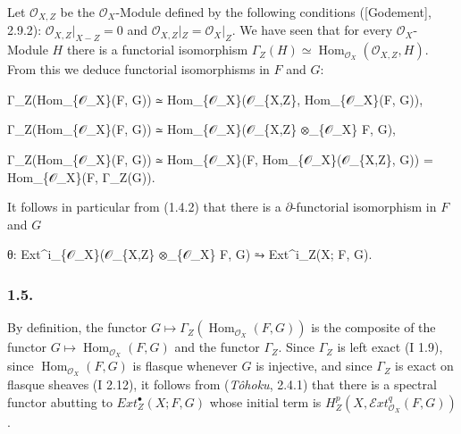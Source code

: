 \documentclass[
]{article}
\newenvironment{Shaded}{}{}
\newcommand{\NormalTok}[1]{#1}
\begin{document}
Let \(\mathcal{O}_{X,Z}\) be the \(\mathcal{O}_{X}\)-Module defined by
the following conditions ({[}Godement{]}, 2.9.2):
\(\mathcal{O}_{X,Z}|_{X - Z} = 0\) and
\(\mathcal{O}_{X,Z}|_{Z} = \mathcal{O}_{X}|_{Z}\). We have seen that for
every \(\mathcal{O}_{X}\)-Module \(H\) there is a functorial isomorphism
\(\Gamma_{Z}(H) \simeq \operatorname{Hom}_{\mathcal{O}_{X}}(\mathcal{O}_{X,Z}, H)\).
From this we deduce functorial isomorphisms in \(F\) and \(G\):

\begin{Shaded}
\begin{Highlighting}[]
\NormalTok{Γ\_Z(Hom\_\{𝒪\_X\}(F, G)) ≃ Hom\_\{𝒪\_X\}(𝒪\_\{X,Z\}, Hom\_\{𝒪\_X\}(F, G)),}
\end{Highlighting}
\end{Shaded}

\begin{Shaded}
\begin{Highlighting}[]
\NormalTok{Γ\_Z(Hom\_\{𝒪\_X\}(F, G)) ≃ Hom\_\{𝒪\_X\}(𝒪\_\{X,Z\} ⊗\_\{𝒪\_X\} F, G),}
\end{Highlighting}
\end{Shaded}

\begin{Shaded}
\begin{Highlighting}[]
\NormalTok{Γ\_Z(Hom\_\{𝒪\_X\}(F, G)) ≃ Hom\_\{𝒪\_X\}(F, Hom\_\{𝒪\_X\}(𝒪\_\{X,Z\}, G)) = Hom\_\{𝒪\_X\}(F, Γ\_Z(G)).}
\end{Highlighting}
\end{Shaded}

It follows in particular from (1.4.2) that there is a
\(\partial\)-functorial isomorphism in \(F\) and \(G\)

\begin{Shaded}
\begin{Highlighting}[]
\NormalTok{θ: Ext\^{}i\_\{𝒪\_X\}(𝒪\_\{X,Z\} ⊗\_\{𝒪\_X\} F, G) ⥲ Ext\^{}i\_Z(X; F, G).}
\end{Highlighting}
\end{Shaded}

\subsubsection{1.5.}\label{section-2}

By definition, the functor
\(G \mapsto \Gamma_{Z}(\operatorname{Hom}_{\mathcal{O}_{X}}(F, G))\) is
the composite of the functor
\(G \mapsto \operatorname{Hom}_{\mathcal{O}_{X}}(F, G)\) and the functor
\(\Gamma_{Z}\). Since \(\Gamma_{Z}\) is left exact (I 1.9), since
\(\operatorname{Hom}_{\mathcal{O}_{X}}(F, G)\) is flasque whenever \(G\)
is injective, and since \(\Gamma_{Z}\) is exact on flasque sheaves (I
2.12), it follows from (\emph{Tôhoku}, 2.4.1) that there is a spectral
functor abutting to \(Ext^{\bullet}_{Z}(X; F, G)\) whose initial term is
\(H^{p}_{Z}(X, \mathcal{E}xt^{q}_{\mathcal{O}_{X}}(F, G))\).
\end{document}
